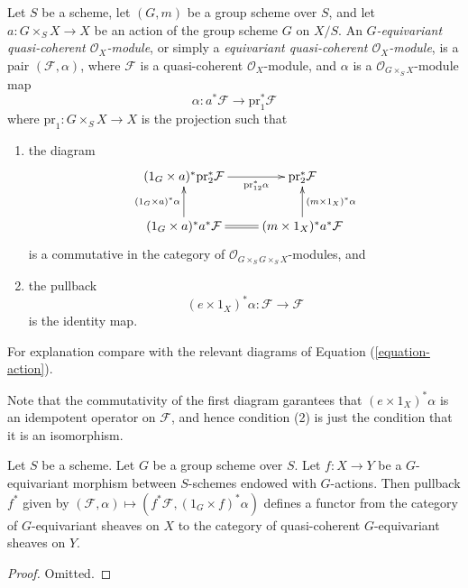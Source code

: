 \begin{definition}
\label{definition-equivariant-module}
Let $S$ be a scheme, let $(G, m)$ be a group scheme over $S$, and
let $a : G \times_S X \to X$ be an action of the group scheme $G$
on $X/S$. An {\it $G$-equivariant quasi-coherent $\mathcal{O}_X$-module},
or simply a {\it equivariant quasi-coherent $\mathcal{O}_X$-module},
is a pair $(\mathcal{F}, \alpha)$, where $\mathcal{F}$ is a quasi-coherent
$\mathcal{O}_X$-module, and $\alpha$ is a $\mathcal{O}_{G \times_S X}$-module
map
$$
\alpha : a^*\mathcal{F} \longrightarrow \text{pr}_1^*\mathcal{F}
$$
where $\text{pr}_1 : G \times_S X \to X$ is the projection
such that
\begin{enumerate}
\item the diagram
$$
\xymatrix{
(1_G \times a)^*\text{pr}_2^*\mathcal{F} \ar[r]_-{\text{pr}_{12}^*\alpha} &
\text{pr}_2^*\mathcal{F} \\
(1_G \times a)^*a^*\mathcal{F} \ar[u]^{(1_G \times a)^*\alpha} \ar@{=}[r] &
(m \times 1_X)^*a^*\mathcal{F} \ar[u]_{(m \times 1_X)^*\alpha}
}
$$
is a commutative in the category of
$\mathcal{O}_{G \times_S G \times_S X}$-modules, and
\item the pullback
$$
(e \times 1_X)^*\alpha : \mathcal{F} \longrightarrow \mathcal{F}
$$
is the identity map.
\end{enumerate}
For explanation compare with the relevant diagrams of
Equation (\ref{equation-action}).
\end{definition}

\noindent
Note that the commutativity of the first diagram garantees that
$(e \times 1_X)^*\alpha$ is an idempotent operator on $\mathcal{F}$,
and hence condition (2) is just the condition that it is an isomorphism.

\begin{lemma}
\label{lemma-pullback-equivariant}
Let $S$ be a scheme. Let $G$ be a group scheme over $S$.
Let $f : X \to Y$ be a $G$-equivariant morphism between $S$-schemes
endowed with $G$-actions. Then pullback $f^*$ given by
$(\mathcal{F}, \alpha) \mapsto (f^*\mathcal{F}, (1_G \times f)^*\alpha)$
defines a functor from the category of $G$-equivariant sheaves on
$X$ to the category of quasi-coherent $G$-equivariant sheaves on $Y$.
\end{lemma}

\begin{proof}
Omitted.
\end{proof}





